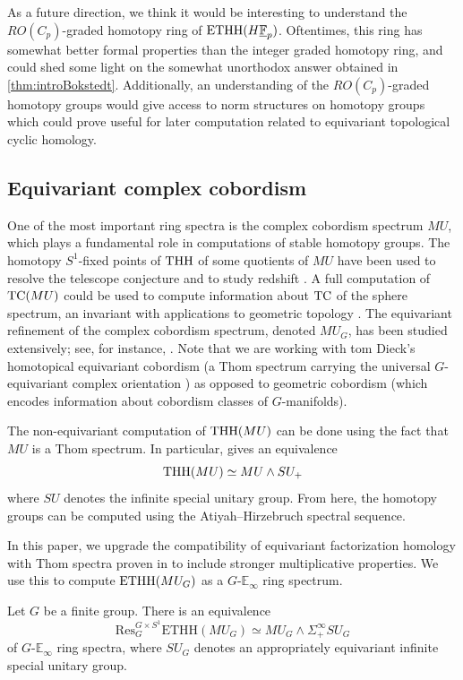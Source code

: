 As a future direction, we think it would be interesting to understand the $RO(C_p)$-graded homotopy ring of $\mathrm{ETHH}(H\underline{\mathbb{F}}_p)$.  Oftentimes, this ring has somewhat better formal properties than the integer graded homotopy ring, and could shed some light on the somewhat unorthodox answer obtained in \cref{thm:introBokstedt}. Additionally, an understanding of the $RO(C_p)$-graded homotopy groups would give access to norm structures on homotopy groups which could prove useful for later computation related to equivariant topological cyclic homology.




\subsection{Equivariant complex cobordism}

One of the most important ring spectra is the complex cobordism spectrum $MU$, which plays a fundamental role in computations of stable homotopy groups. The homotopy $S^1$-fixed points of $\mathrm{THH}$ of some quotients of $MU$ have been used to resolve the telescope conjecture \cite{BHLS23} and to study redshift \cite{HW22}. A full computation of $\mathrm{TC}(MU)$ could be used to compute information about $\mathrm{TC}$ of the sphere spectrum, an invariant with applications to geometric topology \cite{Hesselholt:Whitehead,Rognes:Cobordism}. The equivariant refinement of the complex cobordism spectrum, denoted $MU_G$, has been studied extensively; see, for instance, \cite{GreenleesMay:Localization,Hausmann}. Note that we are working with tom Dieck's homotopical equivariant cobordism (a Thom spectrum carrying the universal $G$-equivariant complex orientation \cite{CGK02}) as opposed to geometric cobordism (which encodes information about cobordism classes of $G$-manifolds).

The non-equivariant computation of $\mathrm{THH}(MU)$ can be done using the fact that $MU$ is a Thom spectrum.  In particular, \cite{BCS10} gives an equivalence
\[
    \mathrm{THH}(MU)\simeq MU\wedge SU_+
\]
where $SU$ denotes the infinite special unitary group. From here, the homotopy groups can be computed using the Atiyah--Hirzebruch spectral sequence.

In this paper, we upgrade the compatibility of equivariant factorization homology with Thom spectra proven in \cite{HHKWZ24} to include stronger multiplicative properties. We use this to compute $\mathrm{ETHH}(MU_G)$ as a $G$-$\mathbb{E}_\infty$ ring spectrum.
\begin{introtheorem}\label{introthm:identification-of-ETHH-of-MU_G}
    Let $G$ be a finite group. There is an equivalence
    \[
        \mathrm{Res}_{G}^{G \times S^1} \mathrm{ETHH}(MU_G) \simeq MU_G \wedge \Sigma^\infty _+ SU_G
    \]
    of $G$-$\mathbb{E}_\infty$ ring spectra, where $SU_G$ denotes an appropriately equivariant infinite special unitary group.
\end{introtheorem}

